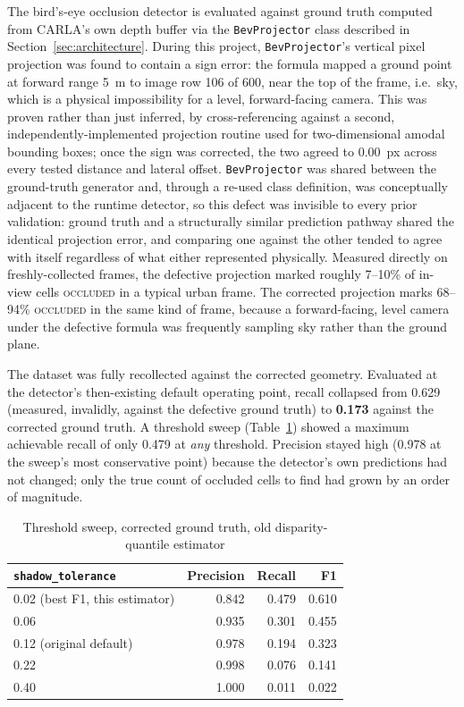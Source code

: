 \documentclass[conference]{IEEEtran}
\begin{document}
The bird's-eye occlusion detector is evaluated against ground truth
computed from CARLA's own depth buffer via the \texttt{BevProjector}
class described in Section~\ref{sec:architecture}. During this
project, \texttt{BevProjector}'s vertical pixel projection was found to
contain a sign error: the formula mapped a ground point at forward
range 5~m to image row 106 of 600, near the top of the frame, i.e.\
sky, which is a physical impossibility for a level, forward-facing
camera. This was proven rather than just inferred, by cross-referencing
against a second, independently-implemented projection routine used for
two-dimensional amodal bounding boxes; once the sign was corrected, the
two agreed to $0.00$~px across every tested distance and lateral
offset. \texttt{BevProjector} was shared between the ground-truth
generator and, through a re-used class definition, was conceptually
adjacent to the runtime detector, so this defect was invisible to every
prior validation: ground truth and a structurally similar prediction
pathway shared the identical projection error, and comparing one
against the other tended to agree with itself regardless of what either
represented physically. Measured directly on freshly-collected frames,
the defective projection marked roughly 7--10\% of in-view cells
\textsc{occluded} in a typical urban frame. The corrected projection
marks 68--94\% \textsc{occluded} in the same kind of frame, because a
forward-facing, level camera under the defective formula was
frequently sampling sky rather than the ground plane.

The dataset was fully recollected against the corrected geometry.
Evaluated at the detector's then-existing default operating point,
recall collapsed from 0.629 (measured, invalidly, against the
defective ground truth) to \textbf{0.173} against the corrected ground
truth. A threshold sweep (Table~\ref{tab:sweep-old}) showed a maximum
achievable recall of only 0.479 at \emph{any} threshold. Precision
stayed high (0.978 at the sweep's most conservative point) because the
detector's own predictions had not changed; only the true count of
occluded cells to find had grown by an order of magnitude.

\begin{table}[htbp]
\caption{Threshold sweep, corrected ground truth, old disparity-quantile estimator}
\label{tab:sweep-old}
\centering
\begin{tabular}{@{}lrrr@{}}
\toprule
\texttt{shadow\_tolerance} & Precision & Recall & F1 \\
\midrule
0.02 (best F1, this estimator) & 0.842 & 0.479 & 0.610 \\
0.06 & 0.935 & 0.301 & 0.455 \\
0.12 (original default) & 0.978 & 0.194 & 0.323 \\
0.22 & 0.998 & 0.076 & 0.141 \\
0.40 & 1.000 & 0.011 & 0.022 \\
\bottomrule
\end{tabular}
\end{table}
\end{document}

